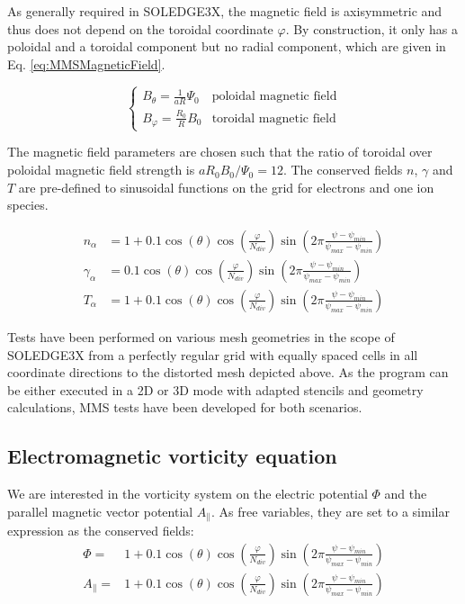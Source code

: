 As generally required in SOLEDGE3X, the magnetic field is axisymmetric and thus does not depend on the toroidal coordinate $\varphi$. By construction, it only has a poloidal and a toroidal component but no radial component, which are given in Eq. \ref{eq:MMSMagneticField}.

\begin{equation}
	\label{eq:MMSMagneticField}
	\begin{cases}
		B_\theta = \frac{1}{aR}\Psi_0 & \text{poloidal magnetic field}  \\
		B_\varphi = \frac{R_0}{R}B_0 & \text{toroidal magnetic field}
	\end{cases}
\end{equation}

The magnetic field parameters are chosen such that the ratio of toroidal over poloidal magnetic field strength is $aR_0B_0/\Psi_0 = 12$. The conserved fields $n$, $\gamma$ and $T$ are pre-defined to sinusoidal functions on the grid for electrons and one ion species. 

\begin{align}
	n_\alpha &= 1  + 0.1 \cos(\theta)\cos(\frac{\varphi}{N_{div}})\sin(2\pi \frac{\psi-\psi_{min}}{\psi_{max} - \psi_{min}}) \\
	\gamma_\alpha &= 0.1 \cos(\theta)\cos(\frac{\varphi}{N_{div}})\sin(2\pi \frac{\psi-\psi_{min}}{\psi_{max} - \psi_{min}}) \\
	T_\alpha &= 1  + 0.1 \cos(\theta)\cos(\frac{\varphi}{N_{div}})\sin(2\pi \frac{\psi-\psi_{min}}{\psi_{max} - \psi_{min}})
\end{align}

Tests have been performed on various mesh geometries in the scope of SOLEDGE3X from a perfectly regular grid with equally spaced cells in all coordinate directions to the distorted mesh depicted above. As the program can be either executed in a 2D or 3D mode with adapted stencils and geometry calculations, MMS tests have been developed for both scenarios. \\


\subsection{Electromagnetic vorticity equation}

We are interested in the vorticity system on the electric potential $\Phi$ and the parallel magnetic vector potential $A_\parallel$. As free variables, they are set to a similar expression as the conserved fields: 
\begin{align}
	\Phi =& 1 + 0.1 \cos(\theta)\cos(\frac{\varphi}{N_{div}})\sin(2\pi \frac{\psi-\psi_{min}}{\psi_{max} - \psi_{min}}) \\
	A_\parallel =& 1 + 0.1 \cos(\theta)\cos(\frac{\varphi}{N_{div}})\sin(2\pi \frac{\psi-\psi_{min}}{\psi_{max} - \psi_{min}})
	\label{eq:MMSAnalyticFormPhiAPara}
\end{align}

